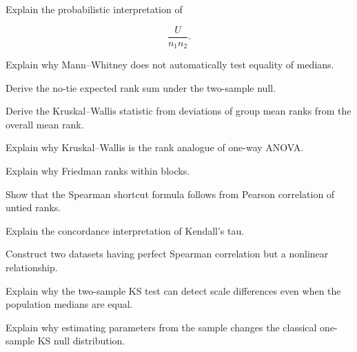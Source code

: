 \begin{exercise}[3]
Explain the probabilistic interpretation of

\[
\frac{U}{n_1n_2}.
\]
\end{exercise}

\begin{exercise}[3]
Explain why Mann--Whitney does not automatically test equality of
medians.
\end{exercise}

\begin{exercise}[3]
Derive the no-tie expected rank sum under the two-sample null.
\end{exercise}

\begin{exercise}[3]
Derive the Kruskal--Wallis statistic from deviations of group mean ranks
from the overall mean rank.
\end{exercise}

\begin{exercise}[3]
Explain why Kruskal--Wallis is the rank analogue of one-way ANOVA.
\end{exercise}

\begin{exercise}[3]
Explain why Friedman ranks within blocks.
\end{exercise}

\begin{exercise}[3]
Show that the Spearman shortcut formula follows from Pearson correlation
of untied ranks.
\end{exercise}

\begin{exercise}[3]
Explain the concordance interpretation of Kendall's tau.
\end{exercise}

\begin{exercise}[3]
Construct two datasets having perfect Spearman correlation but a
nonlinear relationship.
\end{exercise}

\begin{exercise}[3]
Explain why the two-sample KS test can detect scale differences even when
the population medians are equal.
\end{exercise}

\begin{exercise}[3]
Explain why estimating parameters from the sample changes the classical
one-sample KS null distribution.
\end{exercise}

